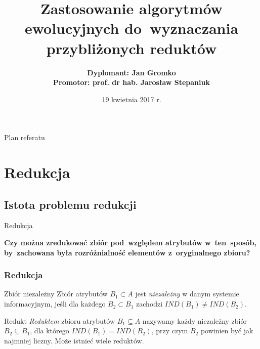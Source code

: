\documentclass[10pt]{beamer}
\title[Zastosowanie algorytmów ewolucyjnych do wyznaczania przybliżonych reduktów] %
{ %
      \textbf{Zastosowanie algorytmów ewolucyjnych do~wyznaczania przybliżonych reduktów}
}
\author[Jan Gromko]
{
	\textbf{Dyplomant: Jan Gromko}\\
	\textbf{Promotor: prof. dr hab. Jarosław Stepaniuk}
}
\institute[WI PB]
{
      Wydział Informatyki Politechniki Białostockiej
}
\date{19 kwietnia 2017 r.}
\begin{document}
{\1%
\begin{frame}
\begin{spacing}{1.5}
  \titlepage
\end{spacing}
\end{frame}}


\begin{frame}{Plan referatu}{}
\tableofcontents
\end{frame}


\section{Redukcja}

\subsection{Istota problemu redukcji}
\begin{frame}{Redukcja}
\begin{spacing}{1.5}
\textbf{Czy można zredukować zbiór pod~względem atrybutów w~ten~sposób, by~zachowana była rozróżnialność elementów z~oryginalnego zbioru?}
\end{spacing}
\end{frame}

\begin{frame}
\frametitle{Redukcja}
\begin{spacing}{1.5}
\begin{block}{Zbiór niezależny}
Zbiór atrybutów $B_{1} \subset A$ jest \textit{niezależny} w danym systemie informacyjnym, jeśli dla każdego $B_{2} \subset B_{1}$ zachodzi $IND(B_{1}) \neq IND(B_{2})$.
\end{block}

\begin{block}{Redukt}
\textit{Reduktem} zbioru atrybutów $B_{1} \subseteq A$ nazywamy każdy niezależny zbiór $B_{2} \subseteq B_{1}$, dla którego $IND(B_{1}) = IND(B_{2})$, przy czym $B_{2}$ powinien być 
jak najmniej liczny. Może istnieć wiele reduktów.
\end{block}
\end{spacing}
\end{frame}
\end{document}

